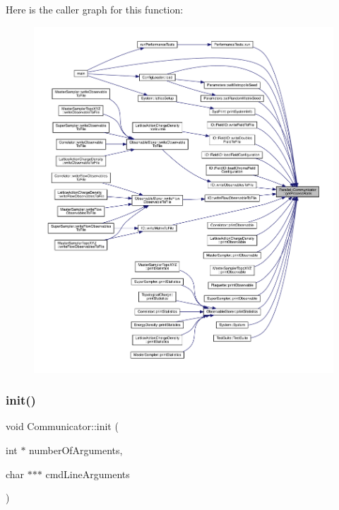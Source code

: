 Here is the caller graph for this function\+:\nopagebreak
\begin{figure}[H]
\begin{center}
\leavevmode
\includegraphics[width=350pt]{class_parallel_1_1_communicator_a474ab433da0e83ef372d74e26a7e5cb0_icgraph}
\end{center}
\end{figure}
\mbox{\label{class_parallel_1_1_communicator_a4ed2a77c33cd899b31131e44fc906fd7}} 
\subsubsection{\texorpdfstring{init()}{init()}}
{\footnotesize\ttfamily void Communicator\+::init (\begin{DoxyParamCaption}\item[{int $\ast$}]{number\+Of\+Arguments,  }\item[{char $\ast$$\ast$$\ast$}]{cmd\+Line\+Arguments }\end{DoxyParamCaption})\hspace{0.3cm}{\ttfamily [static]}}



